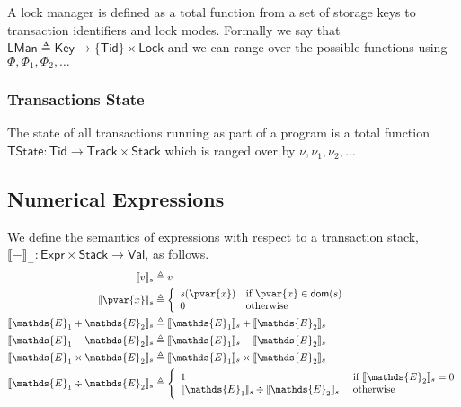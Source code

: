 A lock manager is defined as a total function from a set of storage keys to transaction identifiers and lock modes. Formally we say that $\mathsf{LMan} \triangleq \mathsf{Key} \rightarrow \{ \mathsf{Tid} \} \times \mathsf{Lock}$ and we can range over the possible functions using $\Phi, \Phi_1, \Phi_2, \ldots$

\subsubsection{Transactions State}

The state of all transactions running as part of a program is a total function $\mathsf{TState} : \mathsf{Tid} \rightarrow \mathsf{Track} \times \mathsf{Stack}$ which is ranged over by $\nu, \nu_1, \nu_2, \ldots$

\subsection{Numerical Expressions}

We define the semantics of expressions with respect to a transaction stack, $\llbracket - \rrbracket_- : \mathsf{Expr} \times \mathsf{Stack} \rightarrow \mathsf{Val}$, as follows.
\begin{align*}
\llbracket v \rrbracket_s &\triangleq v \\
\llbracket \pvar{x} \rrbracket_s &\triangleq
\bigg\{ \begin{array}{l l}
s(\pvar{x}) &\text{if } \pvar{x} \in \textsf{dom}(s)\\
0&\text{otherwise}
\end{array} \\
\llbracket \mathds{E}_1 + \mathds{E}_2 \rrbracket_s &\triangleq \llbracket \mathds{E}_1 \rrbracket_s + \llbracket \mathds{E}_2 \rrbracket_s \\
\llbracket \mathds{E}_1 - \mathds{E}_2 \rrbracket_s &\triangleq \llbracket \mathds{E}_1 \rrbracket_s - \llbracket \mathds{E}_2 \rrbracket_s \\
\llbracket \mathds{E}_1 \times \mathds{E}_2 \rrbracket_s &\triangleq \llbracket \mathds{E}_1 \rrbracket_s \times \llbracket \mathds{E}_2 \rrbracket_s \\
\llbracket \mathds{E}_1 \div \mathds{E}_2 \rrbracket_s &\triangleq 
\Bigg\{ \begin{array}{l l}
1 &\text{ if } \llbracket \mathds{E}_2 \rrbracket_s = 0 \\
\llbracket \mathds{E}_1 \rrbracket_s \div \llbracket \mathds{E}_2 \rrbracket_s &\text{ otherwise} \\
\end{array}
\end{align*}

